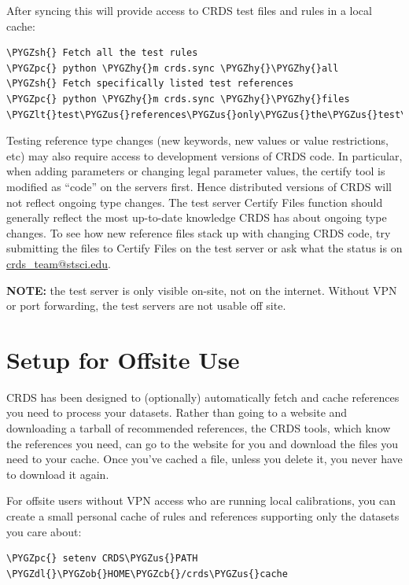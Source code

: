 \documentclass[letterpaper,10pt,english]{sphinxmanual}
\def\PYGZus{\char`\_}
\def\PYGZob{\char`\{}
\def\PYGZcb{\char`\}}
\def\PYGZlt{\char`\<}
\def\PYGZgt{\char`\>}
\def\PYGZsh{\char`\#}
\def\PYGZpc{\char`\%}
\def\PYGZdl{\char`\$}
\def\PYGZhy{\char`\-}
\begin{document}
After syncing this will provide access to CRDS test files and rules in a local cache:

\begin{Verbatim}[commandchars=\\\{\}]
\PYGZsh{} Fetch all the test rules
\PYGZpc{} python \PYGZhy{}m crds.sync \PYGZhy{}\PYGZhy{}all
\PYGZsh{} Fetch specifically listed test references
\PYGZpc{} python \PYGZhy{}m crds.sync \PYGZhy{}\PYGZhy{}files \PYGZlt{}test\PYGZus{}references\PYGZus{}only\PYGZus{}the\PYGZus{}test\PYGZus{}server\PYGZus{}has...\PYGZgt{}
\end{Verbatim}

Testing reference type changes (new keywords,  new values or value restrictions, etc) may also require access to
development versions of CRDS code.   In particular,  when adding parameters or changing legal parameter values,
the certify tool is modified as ``code'' on the servers first.   Hence distributed versions of CRDS will not reflect
ongoing type changes.   The test server Certify Files function should generally reflect the most up-to-date knowledge
CRDS has about ongoing type changes.  To see how new reference files stack up with changing CRDS code,  try submitting
the files to Certify Files on the test server or ask what the status is on \href{mailto:crds\_team@stsci.edu}{crds\_team@stsci.edu}.

\textbf{NOTE:} the test server is only visible on-site,  not on the internet.  Without VPN or port forwarding,  the test
servers are not usable off site.


\section{Setup for Offsite Use}
\label{installation:setup-for-offsite-use}
CRDS has been designed to (optionally) automatically fetch and cache references you need to process your datasets.
Rather than going to a website and downloading a tarball of recommended references,  the CRDS tools,  which know
the references you need,  can go to the website for you and download the files you need to your cache.  Once you've
cached a file,  unless you delete it,  you never have to download it again.

For offsite users without VPN access who are running local calibrations,  you can create a small personal
cache of rules and references supporting only the datasets you care about:

\begin{Verbatim}[commandchars=\\\{\}]
\PYGZpc{} setenv CRDS\PYGZus{}PATH  \PYGZdl{}\PYGZob{}HOME\PYGZcb{}/crds\PYGZus{}cache
\end{Verbatim}
\end{document}
